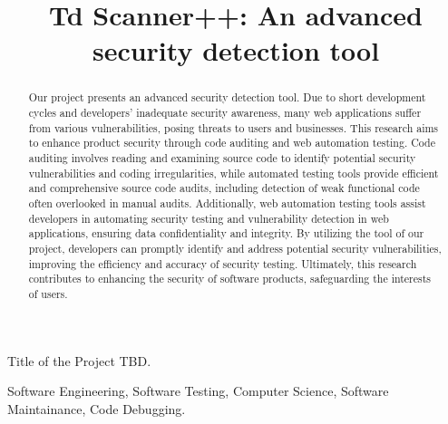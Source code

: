 \documentclass[journal]{IEEEtran}
\begin{document}
\title{%
Td Scanner++: An advanced security detection tool
}





%
{Title of the Project TBD.}

\maketitle

\begin{abstract}
Our project presents an advanced security detection tool. Due to short development cycles and developers' inadequate security awareness, many web applications suffer from various vulnerabilities, posing threats to users and businesses. This research aims to enhance product security through code auditing and web automation testing. Code auditing involves reading and examining source code to identify potential security vulnerabilities and coding irregularities, while automated testing tools provide efficient and comprehensive source code audits, including detection of weak functional code often overlooked in manual audits. Additionally, web automation testing tools assist developers in automating security testing and vulnerability detection in web applications, ensuring data confidentiality and integrity. By utilizing the tool of our project, developers can promptly identify and address potential security vulnerabilities, improving the efficiency and accuracy of security testing. Ultimately, this research contributes to enhancing the security of software products, safeguarding the interests of users.

\end{abstract}

\begin{IEEEkeywords}
Software Engineering, Software Testing, Computer Science, Software Maintainance, Code Debugging.
\end{IEEEkeywords}
\end{document}

